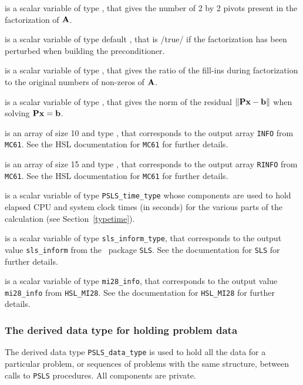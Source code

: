 \documentclass{galahad}
\newcommand{\packagename}{PSLS}
\begin{document}
\begin{description}
 is a scalar variable of type \integer,
that gives the number of 2 by 2 pivots present in the factorization
of ${\mathbf{A}}$.

 is a scalar variable of type default \logical,
that is /true/ if the factorization has been perturbed when building the
preconditioner.

 is a scalar variable of type \realdp,
that gives the ratio of the fill-ins during factorization to the
original numbers of non-zeros of ${\mathbf{A}}$.

 is a scalar variable of type \realdp,
that gives the norm of the residual $\|{\mathbf{P}} {\mathbf{x}} - {\mathbf{b}}\|$
when solving ${\mathbf{P}} {\mathbf{x}} = {\mathbf{b}}$.

 is an array of size 10 and type \integer,
that corresponds to the output array {\tt INFO}
from {\tt MC61}. See the HSL documentation for {\tt MC61} for further
details.

 is an array of size 15 and type \realdp,
that corresponds to the output array {\tt RINFO}
from {\tt MC61}. See the HSL documentation for {\tt MC61} for further
details.

 is a scalar variable of type {\tt \packagename\_time\_type}
whose components are used to hold elapsed CPU and system clock times
(in seconds) for the various parts of the calculation
(see Section~\ref{typetime}).

 is a scalar variable of type {\tt sls\_inform\_type},
that corresponds to the output value {\tt sls\_inform} from the \libraryname\ 
package {\tt SLS}. See the documentation for {\tt SLS} for further details.

 is a scalar variable of type {\tt mi28\_info},
that corresponds to the output value {\tt mi28\_info}
from {\tt HSL\_MI28}. See the documentation for {\tt HSL\_MI28} for further
details.

\end{description}



\subsubsection{The derived data type for holding problem data}\label{typedata}
The derived data type
{\tt \packagename\_data\_type}
is used to hold all the data for a particular problem,
or sequences of problems with the same structure, between calls to
{\tt \packagename} procedures.
All components are private.
\end{document}
